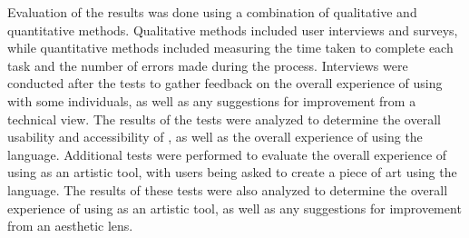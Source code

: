 Evaluation of the results was done using a combination of qualitative and quantitative methods.
Qualitative methods included user interviews and surveys, while quantitative methods included measuring the time taken to complete each task and the number of errors made during the process.
Interviews were conducted after the tests to gather feedback on the overall experience of using \sculpt with some individuals, as well as any suggestions for improvement from a technical view.
The results of the tests were analyzed to determine the overall usability and accessibility of \sculpt, as well as the overall experience of using the language.
Additional tests were performed to evaluate the overall experience of using \sculpt as an artistic tool, with users being asked to create a piece of art using the language.
The results of these tests were also analyzed to determine the overall experience of using \sculpt as an artistic tool, as well as any suggestions for improvement from an aesthetic lens.
\endinput